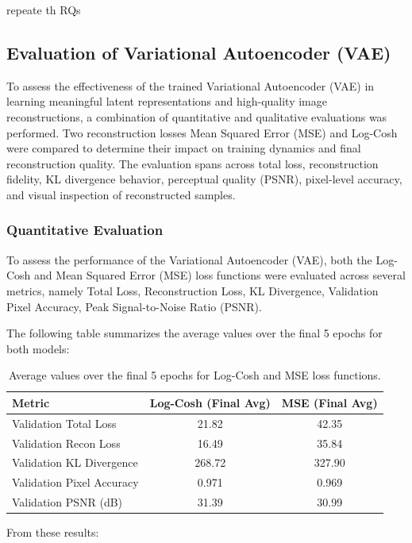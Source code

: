 repeate th RQs
\subsection{Evaluation of Variational Autoencoder (VAE)} \label{subsec:vae_evaluation}
To assess the effectiveness of the trained Variational Autoencoder (VAE) in learning meaningful latent representations and high-quality image reconstructions, a combination of quantitative and qualitative evaluations was performed. Two reconstruction losses Mean Squared Error (MSE) and Log-Cosh were compared to determine their impact on training dynamics and final reconstruction quality. The evaluation spans across total loss, reconstruction fidelity, KL divergence behavior, perceptual quality (PSNR), pixel-level accuracy, and visual inspection of reconstructed samples.

\subsubsection{Quantitative Evaluation}
To assess the performance of the Variational Autoencoder (VAE), both the Log-Cosh and Mean Squared Error (MSE) loss functions were evaluated across several metrics, namely Total Loss, Reconstruction Loss, KL Divergence, Validation Pixel Accuracy, Peak Signal-to-Noise Ratio (PSNR). 

The following table summarizes the average values over the final 5 epochs for both models:

\begin{table}[h]
    \centering
    \begin{tabular}{lcc}
        \toprule
        \textbf{Metric} & \textbf{Log-Cosh (Final Avg)} & \textbf{MSE (Final Avg)} \\
        \midrule
        Validation Total Loss & 21.82 & 42.35 \\
        Validation Recon Loss & 16.49 & 35.84 \\
        Validation KL Divergence & 268.72 & 327.90 \\
        Validation Pixel Accuracy & 0.971 & 0.969 \\
        Validation PSNR (dB) & 31.39 & 30.99 \\
        \bottomrule
    \end{tabular}
    \caption{Average values over the final 5 epochs for Log-Cosh and MSE loss functions.}
    \label{tab:vae_evaluation}
\end{table}

From these results:

